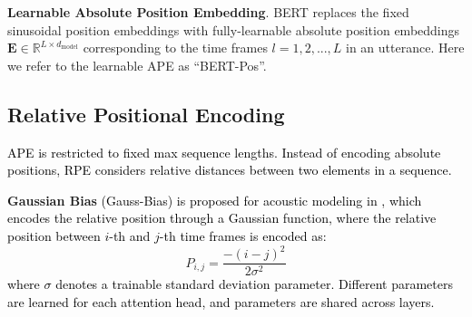 \documentclass[journal]{IEEEtran}
\begin{document}
\textbf{Learnable Absolute Position Embedding}. BERT \cite{bert} replaces the fixed sinusoidal position embeddings with fully-learnable absolute position embeddings $\mathbf{E}\!\in\!\mathbb{R}^{L \times d_\text{model}}$ corresponding to the time frames $l=1,2,...,L$ in an utterance. Here we refer to the learnable APE as ``BERT-Pos''.

\subsection{Relative Positional Encoding}\label{sec:3.2}

\textcolor{black}{APE is restricted to fixed max sequence lengths. Instead of encoding absolute positions, RPE considers relative distances between two elements in a sequence.}

\textbf{Gaussian Bias} \textcolor{black}{(Gauss-Bias) is proposed for acoustic modeling in \cite{gaussbias}, which encodes the relative position through a Gaussian function, where the relative position between $i$-th and $j$-th time frames is encoded as:}
\begin{equation}\label{gauss-bias}
P_{i,j}=\frac{-(i-j)^2}{2 \sigma^2}
\end{equation}
\textcolor{black}{where $\sigma$ denotes a trainable standard deviation parameter. Different parameters are learned for each attention head, and parameters are shared across layers. 
}
\end{document}
